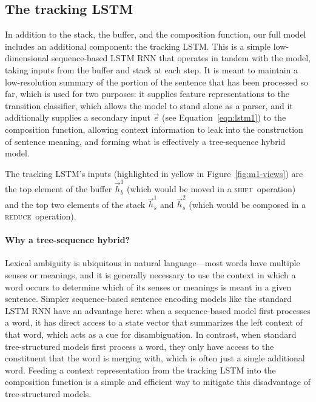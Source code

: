 \documentclass[11pt]{article}
\newcommand{\shift}{\textsc{shift}}
\newcommand{\reduce}{\textsc{reduce}}
\begin{document}
\subsection{The tracking LSTM}\label{sec:tracking}

In addition to the stack, the buffer, and the composition function, our full model includes an additional component: the tracking LSTM. This is a simple low-dimensional sequence-based LSTM RNN that operates in tandem with the model, taking inputs from the buffer and stack at each step. It is meant to maintain a low-resolution summary of the portion of the sentence that has been processed so far, which is used for two purposes: it supplies feature representations to the transition classifier, which allows the model to stand alone as a parser, and it additionally supplies a secondary input $\vec{e}$ (see Equation~\ref{eqn:lstm1}) to the composition function, allowing context information to leak into the construction of sentence meaning, and forming what is effectively a tree-sequence hybrid model.

The tracking LSTM's inputs (highlighted in yellow in Figure~\ref{fig:m1-views}) are the top element of the buffer $\vec{h}_b^1$ (which would be moved in a \shift~operation) and the top two elements of the stack $\vec{h}_s^1$ and $\vec{h}_s^2$ (which would be composed in a \reduce~operation).

\paragraph{Why a tree-sequence hybrid?} 

Lexical ambiguity is ubiquitous in natural language---most words have multiple senses or meanings, and it is generally necessary to use the context in which a word occurs to determine which of its senses or meanings is meant in a given sentence. Simpler sequence-based sentence encoding models like the standard LSTM RNN have an advantage here: when a sequence-based model first processes a word, it has direct access to a state vector that summarizes the left context of that word, which acts as a cue for disambiguation. In contrast, when standard tree-structured models first process a word, they only have access to the constituent that the word is merging with, which is often just a single additional word. Feeding a context representation from the tracking LSTM into the composition function is a simple and efficient way to mitigate this disadvantage of tree-structured models. 
\end{document}
